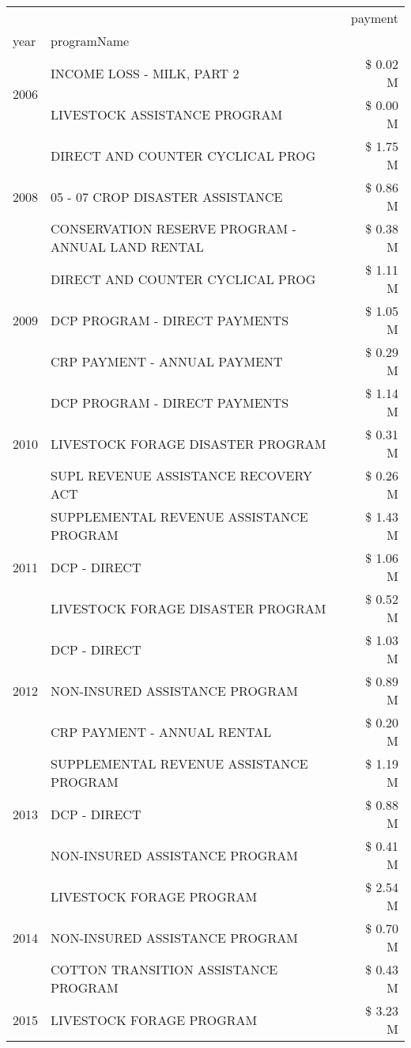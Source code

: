 \begin{tabular}{llr}
\toprule
 &  & payment \\
year & programName &  \\
\midrule
\multirow[t]{2}{*}{2006} & INCOME LOSS - MILK, PART 2 & \$ 0.02 M \\
 & LIVESTOCK ASSISTANCE PROGRAM & \$ 0.00 M \\
\cline{1-3}
\multirow[t]{3}{*}{2008} & DIRECT AND COUNTER CYCLICAL PROG & \$ 1.75 M \\
 & 05 - 07 CROP DISASTER ASSISTANCE & \$ 0.86 M \\
 & CONSERVATION RESERVE PROGRAM - ANNUAL LAND RENTAL & \$ 0.38 M \\
\cline{1-3}
\multirow[t]{3}{*}{2009} & DIRECT AND COUNTER CYCLICAL PROG & \$ 1.11 M \\
 & DCP PROGRAM - DIRECT PAYMENTS & \$ 1.05 M \\
 & CRP PAYMENT - ANNUAL PAYMENT & \$ 0.29 M \\
\cline{1-3}
\multirow[t]{3}{*}{2010} & DCP PROGRAM - DIRECT PAYMENTS & \$ 1.14 M \\
 & LIVESTOCK FORAGE DISASTER  PROGRAM & \$ 0.31 M \\
 & SUPL REVENUE ASSISTANCE RECOVERY ACT & \$ 0.26 M \\
\cline{1-3}
\multirow[t]{3}{*}{2011} & SUPPLEMENTAL REVENUE ASSISTANCE PROGRAM & \$ 1.43 M \\
 & DCP - DIRECT & \$ 1.06 M \\
 & LIVESTOCK FORAGE DISASTER PROGRAM & \$ 0.52 M \\
\cline{1-3}
\multirow[t]{3}{*}{2012} & DCP - DIRECT & \$ 1.03 M \\
 & NON-INSURED ASSISTANCE PROGRAM & \$ 0.89 M \\
 & CRP PAYMENT - ANNUAL RENTAL & \$ 0.20 M \\
\cline{1-3}
\multirow[t]{3}{*}{2013} & SUPPLEMENTAL REVENUE ASSISTANCE PROGRAM & \$ 1.19 M \\
 & DCP - DIRECT & \$ 0.88 M \\
 & NON-INSURED ASSISTANCE PROGRAM & \$ 0.41 M \\
\cline{1-3}
\multirow[t]{3}{*}{2014} & LIVESTOCK FORAGE PROGRAM & \$ 2.54 M \\
 & NON-INSURED ASSISTANCE PROGRAM & \$ 0.70 M \\
 & COTTON TRANSITION ASSISTANCE PROGRAM & \$ 0.43 M \\
\cline{1-3}
\multirow[t]{3}{*}{2015} & LIVESTOCK FORAGE PROGRAM & \$ 3.23 M \\

\end{tabular}

